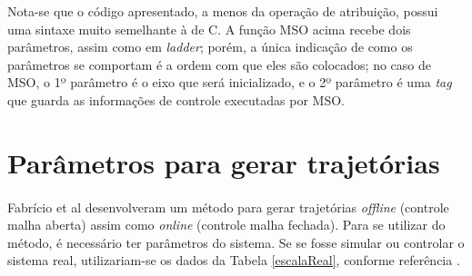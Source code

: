 Nota-se que o código apresentado, a menos da operação de atribuição, possui uma sintaxe muito semelhante à de C. A função MSO acima recebe dois parâmetros, assim como em \textit{ladder}; porém, a única indicação de como os parâmetros se comportam é a ordem com que eles são colocados; no caso de MSO, o 1º parâmetro é o eixo que será inicializado, e o 2º parâmetro é uma \textit{tag} que guarda as informações de controle executadas por MSO.


\section{Parâmetros para gerar trajetórias}

\paragraph{}Fabrício et al \cite{fabricioIFAC} desenvolveram um método para gerar trajetórias \textit{offline} (controle malha aberta) assim como \textit{online} (controle malha fechada). Para se utilizar do método, é necessário ter parâmetros do sistema. Se se fosse simular ou controlar o sistema real, utilizariam-se os dados da Tabela \ref{escalaReal}, conforme referência \cite{redytton}.

